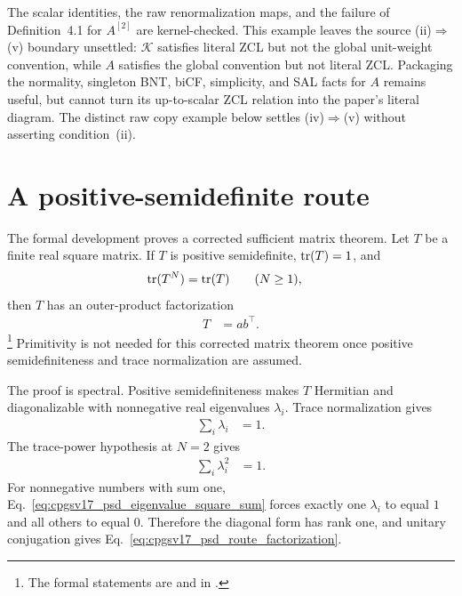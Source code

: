 \documentclass{article}
\begin{document}
The scalar identities, the raw renormalization maps, and the failure of
Definition~4.1 for $A^{[2]}$ are kernel-checked. This example leaves the source
(ii)$\Rightarrow$(v) boundary unsettled: $\mathcal K$ satisfies literal ZCL
but not the global unit-weight convention, while $A$ satisfies the global
convention but not literal ZCL. Packaging the normality, singleton BNT, biCF,
simplicity, and SAL facts for $A$ remains useful, but cannot turn its
up-to-scalar ZCL relation into the paper's literal diagram. The distinct raw
copy example below settles (iv)$\Rightarrow$(v) without asserting
condition~(ii).

\section{A positive-semidefinite route}
\label{sec:cpgsv17_psd_route}

The formal development proves a corrected sufficient matrix theorem. Let $T$
be a finite real square matrix. If $T$ is positive semidefinite,
$\operatorname{tr}(T)=1$, and
\begin{align}
    \operatorname{tr}(T^N)
        &= \operatorname{tr}(T)
        \qquad (N\geq 1),
    \label{eq:cpgsv17_psd_route_trace_hypothesis}
\end{align}
then $T$ has an outer-product factorization
\begin{align}
    T
        &= ab^{\top}.
    \label{eq:cpgsv17_psd_route_factorization}
\end{align}
\footnote{The formal statements are
 and
in .}
Primitivity is not needed for this corrected matrix theorem once positive
semidefiniteness and trace normalization are assumed.

The proof is spectral. Positive semidefiniteness makes $T$ Hermitian and
diagonalizable with nonnegative real eigenvalues $\lambda_i$. Trace
normalization gives
\begin{align}
    \sum_i\lambda_i
        &= 1.
    \label{eq:cpgsv17_psd_eigenvalue_sum}
\end{align}
The trace-power hypothesis at $N=2$ gives
\begin{align}
    \sum_i\lambda_i^2
        &= 1.
    \label{eq:cpgsv17_psd_eigenvalue_square_sum}
\end{align}
For nonnegative numbers with sum one,
Eq.~\ref{eq:cpgsv17_psd_eigenvalue_square_sum} forces exactly one $\lambda_i$
to equal $1$ and all others to equal $0$. Therefore the diagonal form has rank
one, and unitary conjugation gives Eq.~\ref{eq:cpgsv17_psd_route_factorization}.
\end{document}
